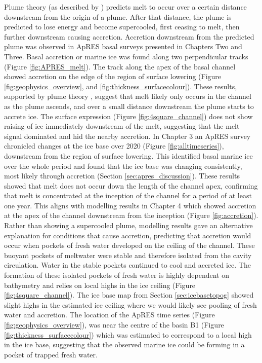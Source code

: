 Plume theory (as described by \cite{jenkins2011convection}) predicts melt to occur over a certain distance downstream from the origin of a plume. After that distance, the plume is predicted to lose energy and become supercooled, first ceasing to melt, then further downstream causing accretion.
Accretion downstream from the predicted plume was observed in ApRES basal surveys presented in Chapters Two and Three. Basal accretion or marine ice was found along two perpendicular tracks (Figure \ref{fig:APRES_melt}). The track along the apex of the basal channel showed  accretion on the edge of the region of surface lowering (Figure \ref{fig:geophysics_overview}, and \ref{fig:thickness_surfacecolour}). These results, supported by plume theory \citep{jenkins1991one}, suggest that melt likely only occurs in the channel as the plume ascends, and over a small distance downstream the plume starts to accrete ice. The surface expression (Figure \ref{fig:4square_channel}) does not show raising of ice immediately downstream of the melt, suggesting that the  melt signal dominated and hid the nearby accretion.
In Chapter 3 an ApRES survey chronicled changes at the ice base over 2020 (Figure \ref{fig:alltimeseries}), downstream from the region of surface lowering. This identified basal marine ice over the whole period and found that the ice base was changing consistently, most likely through accretion (Section \ref{sec:apres_discussion}). These results showed that melt does not occur down the length of the channel apex, confirming that melt is concentrated at the inception of the channel for a period of at least one year.
This aligns with modelling results in Chapter 4 which showed accretion at the apex of the channel downstream from the inception (Figure \ref{fig:accretion}).  Rather than showing a supercooled plume, modelling results gave an alternative explanation for conditions that cause accretion, predicting that accretion would occur when pockets of fresh water developed on the ceiling of the channel. These buoyant pockets of meltwater were stable and therefore isolated from the cavity circulation. Water in the stable pockets continued to cool and accreted ice. The formation of these isolated pockets of fresh water is highly dependent on bathymetry and relies on local highs in the ice ceiling (Figure \ref{fig:4square_channel}). 
The ice base map from Section \ref{sec:icebasetopog} showed slight highs in the estimated ice ceiling where we would likely see pooling of fresh water and accretion. The location of the ApRES time series (Figure \ref{fig:geophysics_overview}), was near the centre of the basin B1 (Figure \ref{fig:thickness_surfacecolour}) which was estimated to correspond to a local high in the ice base, suggesting that the observed marine ice could be forming in a pocket of trapped fresh water.


